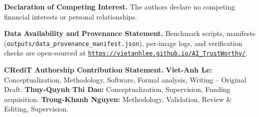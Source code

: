 \documentclass[preprint,10pt]{elsarticle}
\begin{document}
{\footnotesize
\noindent\textbf{Declaration of Competing Interest.} The authors declare no competing financial interests or personal relationships.

\smallskip\noindent\textbf{Data Availability and Provenance Statement.} Benchmark scripts, manifests (\nolinkurl{outputs/data_provenance_manifest.json}), per-image logs, and verification checks are open-sourced at \href{https://vietanhlee.github.io/AI_TrustWorthy/}{\nolinkurl{https://vietanhlee.github.io/AI_TrustWorthy/}}.

\smallskip\noindent\textbf{CRediT Authorship Contribution Statement.} \textbf{Viet-Anh Le:} Conceptualization, Methodology, Software, Formal analysis, Writing -- Original Draft. \textbf{Thuy-Quynh Thi Dao:} Conceptualization, Supervision, Funding acquisition. \textbf{Trong-Khanh Nguyen:} Methodology, Validation, Review \& Editing, Supervision.\par}

\apptocmd{\thebibliography}{\footnotesize\setlength{\itemsep}{-0.5pt}\setlength{\parskip}{0pt}\setlength{\parsep}{0pt}}{}{}
\setlength{\bibsep}{-0.5pt}


\end{document}

